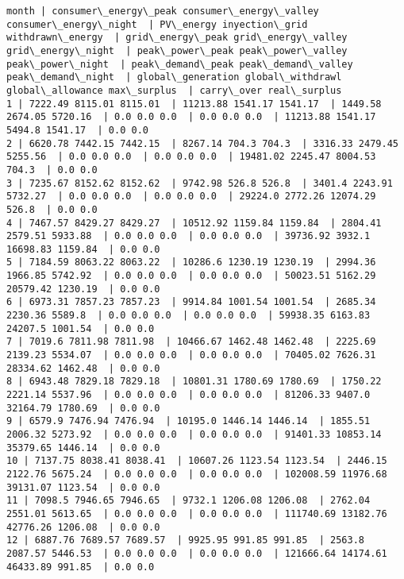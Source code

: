 \documentclass[11pt]{article}
\begin{document}
    \begin{Verbatim}[commandchars=\\\{\}]
month | consumer\_energy\_peak consumer\_energy\_valley consumer\_energy\_night  | PV\_energy inyection\_grid withdrawn\_energy  | grid\_energy\_peak grid\_energy\_valley grid\_energy\_night  | peak\_power\_peak peak\_power\_valley peak\_power\_night  | peak\_demand\_peak peak\_demand\_valley peak\_demand\_night  | global\_generation global\_withdrawl global\_allowance max\_surplus  | carry\_over real\_surplus
1 | 7222.49 8115.01 8115.01  | 11213.88 1541.17 1541.17  | 1449.58 2674.05 5720.16  | 0.0 0.0 0.0  | 0.0 0.0 0.0  | 11213.88 1541.17 5494.8 1541.17  | 0.0 0.0
2 | 6620.78 7442.15 7442.15  | 8267.14 704.3 704.3  | 3316.33 2479.45 5255.56  | 0.0 0.0 0.0  | 0.0 0.0 0.0  | 19481.02 2245.47 8004.53 704.3  | 0.0 0.0
3 | 7235.67 8152.62 8152.62  | 9742.98 526.8 526.8  | 3401.4 2243.91 5732.27  | 0.0 0.0 0.0  | 0.0 0.0 0.0  | 29224.0 2772.26 12074.29 526.8  | 0.0 0.0
4 | 7467.57 8429.27 8429.27  | 10512.92 1159.84 1159.84  | 2804.41 2579.51 5933.88  | 0.0 0.0 0.0  | 0.0 0.0 0.0  | 39736.92 3932.1 16698.83 1159.84  | 0.0 0.0
5 | 7184.59 8063.22 8063.22  | 10286.6 1230.19 1230.19  | 2994.36 1966.85 5742.92  | 0.0 0.0 0.0  | 0.0 0.0 0.0  | 50023.51 5162.29 20579.42 1230.19  | 0.0 0.0
6 | 6973.31 7857.23 7857.23  | 9914.84 1001.54 1001.54  | 2685.34 2230.36 5589.8  | 0.0 0.0 0.0  | 0.0 0.0 0.0  | 59938.35 6163.83 24207.5 1001.54  | 0.0 0.0
7 | 7019.6 7811.98 7811.98  | 10466.67 1462.48 1462.48  | 2225.69 2139.23 5534.07  | 0.0 0.0 0.0  | 0.0 0.0 0.0  | 70405.02 7626.31 28334.62 1462.48  | 0.0 0.0
8 | 6943.48 7829.18 7829.18  | 10801.31 1780.69 1780.69  | 1750.22 2221.14 5537.96  | 0.0 0.0 0.0  | 0.0 0.0 0.0  | 81206.33 9407.0 32164.79 1780.69  | 0.0 0.0
9 | 6579.9 7476.94 7476.94  | 10195.0 1446.14 1446.14  | 1855.51 2006.32 5273.92  | 0.0 0.0 0.0  | 0.0 0.0 0.0  | 91401.33 10853.14 35379.65 1446.14  | 0.0 0.0
10 | 7137.75 8038.41 8038.41  | 10607.26 1123.54 1123.54  | 2446.15 2122.76 5675.24  | 0.0 0.0 0.0  | 0.0 0.0 0.0  | 102008.59 11976.68 39131.07 1123.54  | 0.0 0.0
11 | 7098.5 7946.65 7946.65  | 9732.1 1206.08 1206.08  | 2762.04 2551.01 5613.65  | 0.0 0.0 0.0  | 0.0 0.0 0.0  | 111740.69 13182.76 42776.26 1206.08  | 0.0 0.0
12 | 6887.76 7689.57 7689.57  | 9925.95 991.85 991.85  | 2563.8 2087.57 5446.53  | 0.0 0.0 0.0  | 0.0 0.0 0.0  | 121666.64 14174.61 46433.89 991.85  | 0.0 0.0

    \end{Verbatim}
\end{document}
